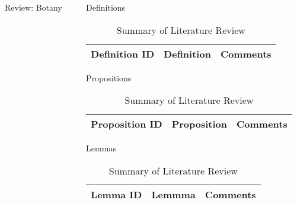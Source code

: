\begin{frame}[t]
\begin{columns}[t]
\begin{column}{\onecolwid}
\begin{alertblock}{Review: Botany}
\end{alertblock}

\end{column}

\begin{column}{\onecolwid} %
\begin{alertblock}{Definitions}

\begin{table}[H]
	\centering
	\begin{tabular}{r|p{12cm}|l}
	\hline
	Definition ID  & Definition & Comments \\
	\hline
	\hline
	\end{tabular}
	\caption{Summary of Literature Review}
\end{table} 

\end{alertblock}
\begin{alertblock}{Propositions}

\begin{table}[H]
	\centering
	\begin{tabular}{r|p{12cm}|l}
	\hline
	Proposition ID  & Proposition & Comments \\
	\hline
	\hline
	\end{tabular}
	\caption{Summary of Literature Review}
\end{table} 

\end{alertblock}
\begin{alertblock}{Lemmas}

\begin{table}[H]
	\centering
	\begin{tabular}{r|p{12cm}|l}
	\hline
	Lemma ID  & Lemmma & Comments \\
	\hline
	\hline
	\end{tabular}
	\caption{Summary of Literature Review}
\end{table} 


\end{alertblock}
\end{column}
\end{columns}
\end{frame}
